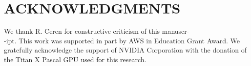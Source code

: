 \documentclass{article}
\newcommand{\squeezeup}{\vspace{-2.5mm}}
\begin{document}
\section{ACKNOWLEDGMENTS}
\label{sec:ack}
\squeezeup
\vspace{-2.0mm}
We thank R. Ceren for 
constructive criticism of this manuscr-\\-ipt. This work was supported in part by AWS in Education Grant Award. We gratefully acknowledge the support of NVIDIA Corporation with the donation of the Titan X Pascal GPU used for this research.\par
\squeezeup
\vspace{-0.071cm}



\squeezeup
\vspace{-0.05cm}


\end{document}
